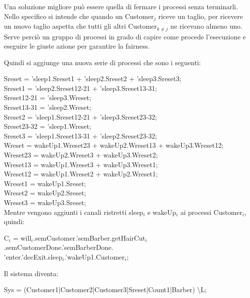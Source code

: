 Una soluzione migliore può essere quella di fermare i processi senza terminarli. Nello specifico si intende che quando un \textsf{Customer$_{j}$} riceve un taglio, per ricevere un nuovo taglio aspetta che tutti gli altri \textsf{Customer$_{k\not=j}$} ne ricevano almeno uno. Serve perciò un gruppo di processi in grado di capire come procede l'esecuzione e eseguire le giuste azione per garantire la fairness.

Quindi si aggiunge una nuova serie di processi che sono i seguenti:

\textsf{Sreset = 'sleep1.Sreset1 + 'sleep2.Sreset2 + 'sleep3.Sreset3;}\\
 \textsf{Sreset1 = 'sleep2.Sreset12-21 + 'sleep3.Sreset13-31;}\\
 \textsf{Sreset12-21 = 'sleep3.Wreset;} \\
 \textsf{Sreset13-31 = 'sleep2.Wreset; }\\
 \textsf{Sreset2 = 'sleep1.Sreset12-21 + 'sleep3.Sreset23-32;}\\
 \textsf{Sreset23-32 = 'sleep1.Wreset;} \\
 \textsf{Sreset3 = 'sleep1.Sreset13-31 + 'sleep2.Sreset23-32;}\\


 \textsf{Wreset = wakeUp1.Wreset23 + wakeUp2.Wreset13 + wakeUp3.Wreset12;}\\
 \textsf{Wreset23 = wakeUp2.Wreset3 + wakeUp3.Wreset2;}\\
 \textsf{Wreset13 = wakeUp1.Wreset3 + wakeUp3.Wreset1;}\\
 \textsf{Wreset12 = wakeUp1.Wreset2 + wakeUp2.Wreset1;}\\
 \textsf{Wreset1 =  wakeUp1.Sreset;}\\
 \textsf{Wreset2 =  wakeUp2.Sreset;}\\
 \textsf{Wreset3 =  wakeUp3.Sreset;}\\

Mentre vengono aggiunti i canali ristretti \textsf{sleep$_{i}$} e \textsf{wakeUp$_{i}$} ai processi \textsf{Customer$_{i}$}, quindi:

\textsf{C$_{i}$ = will$_{i}$.semCustomer.'semBarber.getHairCut$_{i}$.semCustomerDone.'semBarberDone.\\'enter.'decExit.sleep$_{i}$.'wakeUp1.Customer$_{i}$;}

Il sistema diventa:

\textsf{Sys = (Customer1|Customer2|Customer3|Sreset|Count1|Barber) \textbackslash L;}

